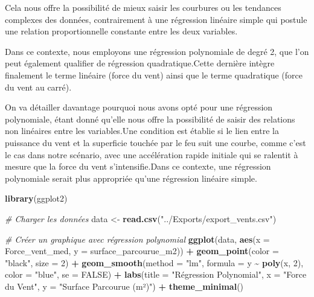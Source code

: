 \documentclass[
]{article}
\newenvironment{Shaded}{\begin{snugshade}}{\end{snugshade}}
\newcommand{\AttributeTok}[1]{\textcolor[rgb]{0.13,0.29,0.53}{#1}}
\newcommand{\CommentTok}[1]{\textcolor[rgb]{0.56,0.35,0.01}{\textit{#1}}}
\newcommand{\ConstantTok}[1]{\textcolor[rgb]{0.56,0.35,0.01}{#1}}
\newcommand{\DecValTok}[1]{\textcolor[rgb]{0.00,0.00,0.81}{#1}}
\newcommand{\FunctionTok}[1]{\textcolor[rgb]{0.13,0.29,0.53}{\textbf{#1}}}
\newcommand{\NormalTok}[1]{#1}
\newcommand{\OtherTok}[1]{\textcolor[rgb]{0.56,0.35,0.01}{#1}}
\newcommand{\SpecialCharTok}[1]{\textcolor[rgb]{0.81,0.36,0.00}{\textbf{#1}}}
\newcommand{\StringTok}[1]{\textcolor[rgb]{0.31,0.60,0.02}{#1}}
\begin{document}
Cela nous offre la possibilité de mieux saisir les courbures ou les
tendances complexes des données, contrairement à une régression linéaire
simple qui postule une relation proportionnelle constante entre les deux
variables.

Dans ce contexte, nous employons une régression polynomiale de degré 2,
que l'on peut également qualifier de régression quadratique.Cette
dernière intègre finalement le terme linéaire (force du vent) ainsi que
le terme quadratique (force du vent au carré).

On va détailler davantage pourquoi nous avons opté pour une régression
polynomiale, étant donné qu'elle nous offre la possibilité de saisir des
relations non linéaires entre les variables.Une condition est établie si
le lien entre la puissance du vent et la superficie touchée par le feu
suit une courbe, comme c'est le cas dans notre scénario, avec une
accélération rapide initiale qui se ralentit à mesure que la force du
vent s'intensifie.Dans ce contexte, une régression polynomiale serait
plus appropriée qu'une régression linéaire simple.

\begin{Shaded}
\begin{Highlighting}[]
\FunctionTok{library}\NormalTok{(ggplot2)}

\CommentTok{\# Charger les données}
\NormalTok{data }\OtherTok{\textless{}{-}} \FunctionTok{read.csv}\NormalTok{(}\StringTok{"../Exports/export\_vents.csv"}\NormalTok{)}

\CommentTok{\# Créer un graphique avec régression polynomial}
\FunctionTok{ggplot}\NormalTok{(data, }\FunctionTok{aes}\NormalTok{(}\AttributeTok{x =}\NormalTok{ Force\_vent\_med, }\AttributeTok{y =}\NormalTok{ surface\_parcourue\_m2)) }\SpecialCharTok{+}
  \FunctionTok{geom\_point}\NormalTok{(}\AttributeTok{color =} \StringTok{"black"}\NormalTok{, }\AttributeTok{size =} \DecValTok{2}\NormalTok{) }\SpecialCharTok{+} 
  \FunctionTok{geom\_smooth}\NormalTok{(}\AttributeTok{method =} \StringTok{"lm"}\NormalTok{, }\AttributeTok{formula =}\NormalTok{ y }\SpecialCharTok{\textasciitilde{}} \FunctionTok{poly}\NormalTok{(x, }\DecValTok{2}\NormalTok{), }\AttributeTok{color =} \StringTok{"blue"}\NormalTok{, }\AttributeTok{se =} \ConstantTok{FALSE}\NormalTok{) }\SpecialCharTok{+} 
  \FunctionTok{labs}\NormalTok{(}\AttributeTok{title =} \StringTok{"Régression Polynomial"}\NormalTok{, }
       \AttributeTok{x =} \StringTok{"Force du Vent"}\NormalTok{, }
       \AttributeTok{y =} \StringTok{"Surface Parcourue (m²)"}\NormalTok{) }\SpecialCharTok{+}
  \FunctionTok{theme\_minimal}\NormalTok{()}
\end{Highlighting}
\end{Shaded}
\end{document}
